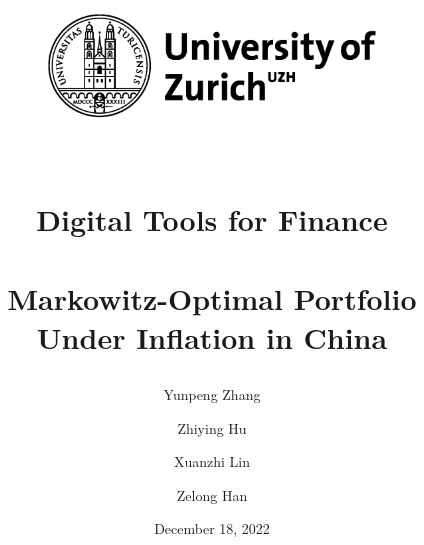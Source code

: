 \documentclass[12pt]{article}
\begin{document}
 
\title{\begin {figure}[H]
\centering
\includegraphics[width=9cm]{badge.png}
\end {figure}\vspace*{2.5cm} \hspace*{-0.5cm} \\\textbf{Digital Tools for Finance\\\vspace{5mm} \\Markowitz-Optimal Portfolio Under Inflation in China}}
\author{Yunpeng Zhang\and Zhiying Hu\and Xuanzhi Lin
\and Zelong Han}
\date{\vspace{5mm} December 18, 2022}
\maketitle
\thispagestyle{empty}

\clearpage
\tableofcontents
\setcounter{page}{1}

\clearpage

\setcounter{page}{1}
\end{document}
